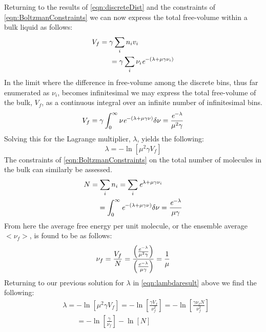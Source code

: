 Returning to the results of \eqn\nolinebreak \ref{eqn:discreteDist} and the constraints of \eqn\nolinebreak \ref{eqn:BoltzmanConstraints} we can now express the total free-volume within a bulk liquid as follows:
\begin{equation}
	\begin{split}
		&V_f=\gamma\sum_{i}n_iv_i\\
		&\;\;\;\;\;\;\;\;\;=\gamma\sum_{i}\nu_i\textit{e}^{-\left(\lambda+\mu\gamma\nu_i\right)}
	\end{split}
	\label{eqn:discreteVfResult}
\end{equation}
In the limit where the difference in free-volume among the discrete bins, thus far enumerated as $\nu_i$, becomes infinitesimal we may express the total free-volume of the bulk, $V_f$, as a continuous integral over an infinite number of infinitesimal bins.
\begin{equation}
	V_f=\gamma\int_{0}^{\infty}\nu\textit{e}^{-\left(\lambda+\mu\gamma\nu\right)}\delta\nu=\frac{\textit{e}^{-\lambda}}{\mu^2\gamma}
	\label{eqn:Vfintigral}
\end{equation}
Solving this for the Lagrange multiplier, $\lambda$, yields the following:
\begin{equation}
	\lambda=-\ln\left[\mu^2\gamma V_f\right]
	\label{eqn:lambdaresult}
\end{equation}
The constraints of \eqn\nolinebreak \ref{eqn:BoltzmanConstraints} on the total number of molecules in the bulk can similarly be assessed. 
\begin{equation}
	\begin{split}
		&N=\sum_{i}n_i=\sum_{i}\textit{e}^{\lambda+\mu\gamma\nu_i}\\
		&\;\;\;\;\;\;\;=\int_{0}^{\infty}\textit{e}^{-\left(\lambda+\mu\gamma\nu\right)}\delta\nu=\frac{\textit{e}^{-\lambda}}{\mu\gamma}
	\end{split}
\end{equation}
From here the average free energy per unit molecule, or the ensemble average $<\nu_f>$, is found to be as follows:
\begin{equation}
	\nu_f=\frac{V_f}{N}=\frac{\left(\frac{\textit{e}^{-\lambda}}{\mu^2\gamma}\right)}{\left(\frac{\textit{e}^{-\lambda}}{\mu\gamma}\right)}=\frac{1}{\mu}
\end{equation}
Returning to our previous solution for $\lambda$ in \eqn\nolinebreak \ref{eqn:lambdaresult} above we find the following:
\begin{equation}
	\begin{split}
		&\lambda=-\ln\left[\mu^2\gamma V_f\right]=-\ln\left[\frac{\gamma V_f}{\nu_f^2}\right]=-\ln\left[\frac{\gamma \nu_f N}{\nu_f^2}\right]\\
		&\;\;\;\;\;\;\;=-\ln\left[\frac{\gamma}{\nu_f}\right]-\ln\left[N\right]
	\end{split}
\end{equation}
